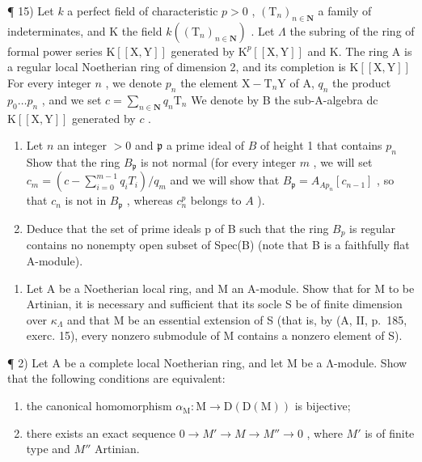 ¶ 15) Let \(k\) a perfect field of characteristic \(p > 0\) , \((\mathrm{T}_{n})_{n \in \mathbf{N}}\) a family of indeterminates, and K the field \(k((\mathrm{T}_{n})_{n \in \mathbf{N}})\) . Let \(\Lambda\) the subring of the ring of formal power series \(\mathrm{K}[[\mathrm{X},\mathrm{Y}]]\) generated by \(\mathrm{K}^{p}[[\mathrm{X},\mathrm{Y}]]\) and K. The ring A is a regular local Noetherian ring of dimension 2, and its completion is \(\mathrm{K}[[\mathrm{X},\mathrm{Y}]]\) For every integer \(n\) , we denote \(p_{n}\) the element \(\mathrm{X} - \mathrm{T}_{n}\mathrm{Y}\) of A, \(q_{n}\) the product \(p_{0} \ldots p_{n}\) , and we set \(c = \sum_{n \in \mathbf{N}} q_{n}\mathrm{T}_{n}\) We denote by B the sub-A-algebra dc \(\mathrm{K}[[\mathrm{X},\mathrm{Y}]]\) generated by \(c\) .

\begin{enumerate}
\def\labelenumi{\alph{enumi})}
\item
  Let \(n\) an integer \(> 0\) and \(\mathfrak{p}\) a prime ideal of \(B\) of height 1 that contains \(p_n\) Show that the ring \(B_{\mathfrak{p}}\) is not normal (for every integer \(m\) , we will set \(c_m = (c - \sum_{i=0}^{m-1} q_i T_i)/q_m\) and we will show that \(B_{\mathfrak{p}} = A_{A p_n}[c_{n-1}]\) , so that \(c_n\) is not in \(B_{\mathfrak{p}}\) , whereas \(c_n^p\) belongs to \(A\) ).
\item
  Deduce that the set of prime ideals p of B such that the ring \(B_{p}\) is regular contains no nonempty open subset of Spec(B) (note that B is a faithfully flat A-module).
\end{enumerate}


\begin{enumerate}
\def\labelenumi{\arabic{enumi})}
\tightlist
\item
  Let A be a Noetherian local ring, and M an A-module. Show that for M to be Artinian, it is necessary and sufficient that its socle S be of finite dimension over \(\kappa_{\Lambda}\) and that M be an essential extension of S (that is, by (A, II, p.~185, exerc. 15), every nonzero submodule of M contains a nonzero element of S).
\end{enumerate}

¶ 2) Let A be a complete local Noetherian ring, and let M be a Λ-module. Show that the following conditions are equivalent:

\begin{enumerate}
\def\labelenumi{(\roman{enumi})}
\item
  the canonical homomorphism \(\alpha_{\mathrm{M}}: \mathrm{M} \to \mathrm{D}(\mathrm{D}(\mathrm{M}))\) is bijective;
\item
  there exists an exact sequence \(0 \to M' \to M \to M'' \to 0\) , where \(M'\) is of finite type and \(M''\) Artinian.
\end{enumerate}

